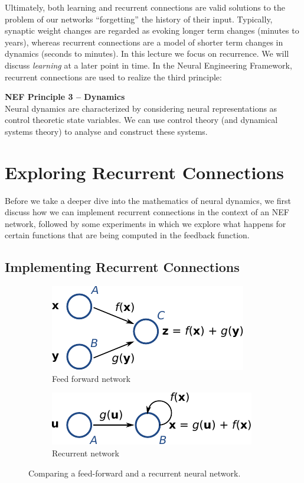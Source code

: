 \documentclass[10pt,letterpaper,oneside]{article}
\begin{document}
Ultimately, both learning and recurrent connections are valid solutions to the problem of our networks \enquote{forgetting} the history of their input. Typically, synaptic weight changes are regarded as evoking longer term changes (minutes to years), whereas recurrent connections are a model of shorter term changes in dynamics (seconds to minutes). In this lecture we focus on recurrence. We will discuss \emph{learning} at a later point in time. In the Neural Engineering Framework, recurrent connections are used to realize the third principle:

\begin{mdframed}
	\textbf{NEF Principle 3 -- Dynamics}\\
	Neural dynamics are characterized by considering neural representations as control theoretic state variables. We can use control theory (and dynamical systems theory) to analyse and construct these systems.
\end{mdframed}

\section{Exploring Recurrent Connections}

Before we take a deeper dive into the mathematics of neural dynamics, we first discuss how we can implement recurrent connections in the context of an NEF network, followed by some experiments in which we explore what happens for certain functions that are being computed in the feedback function.

\subsection{Implementing Recurrent Connections}

\begin{figure}[h]
	\begin{subfigure}[b]{0.6\textwidth}
		\centering
		\includegraphics{media/sum_vs_recurrent_a.pdf}
		\caption{Feed forward network}
		\label{fig:feed_forward_recurrent_a}
	\end{subfigure}
	\begin{subfigure}[b]{0.4\textwidth}
		\centering
		\includegraphics{media/sum_vs_recurrent_b.pdf}
		\caption{Recurrent network}
		\label{fig:feed_forward_recurrent_b}
	\end{subfigure}
	\caption{Comparing a feed-forward and a recurrent neural network.}
	\label{fig:feed_forward_recurrent}
\end{figure}
\end{document}
